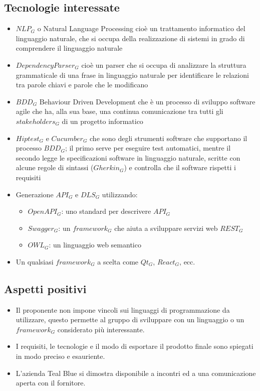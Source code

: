 \subsection{Tecnologie interessate}
\begin{itemize}
	\item $NLP_G$ o Natural Language Processing cioè un trattamento informatico del linguaggio naturale, che si occupa della realizzazione di sistemi in grado di comprendere il linguaggio naturale	
	\item $Dependency Parser_G$ cioè un parser che si occupa di analizzare la struttura grammaticale di una frase in linguaggio naturale per identificare le relazioni tra parole chiavi e parole che le modificano
	\item $BDD_G$ Behaviour Driven Development che è un processo di sviluppo software agile che ha, alla sua base, una continua comunicazione tra tutti gli $stakeholders_G$ di un progetto informatico
	\item $Hiptest_G$ e $Cucumber_G$ che sono degli strumenti software che supportano il processo $BDD_G$; il primo serve per eseguire test automatici, mentre il secondo legge le specificazioni software in linguaggio naturale, scritte con alcune regole di sintassi ($Gherkin_G$) e controlla che il software rispetti i requisiti
	\item Generazione $API_G$ e $DLS_G$ utilizzando:
	\begin{itemize}
		\item $OpenAPI_G$: uno standard per descrivere $API_G$
		\item $Swagger_G$: un $framework_G$ che aiuta a sviluppare servizi web $REST_G$
		\item $OWL_G$: un linguaggio web semantico
	\end{itemize}
	\item Un qualsiasi $framework_G$ a scelta come $Qt_G$, $React_G$, ecc.
\end{itemize} 
\subsection{Aspetti positivi}
\begin{itemize} 
	\item Il proponente non impone vincoli sui linguaggi di programmazione da utilizzare, questo permette  al gruppo di sviluppare con un linguaggio o un $framework_G$ considerato più interessante. 
	\item I requisiti, le tecnologie e il modo di esportare il prodotto finale sono spiegati in modo preciso e esauriente.
	\item L'azienda Teal Blue si dimostra disponibile a incontri ed a una comunicazione aperta con il fornitore.
\end{itemize}
